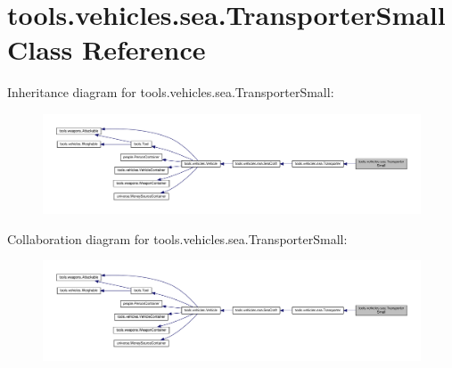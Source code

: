 \hypertarget{classtools_1_1vehicles_1_1sea_1_1_transporter_small}{}\section{tools.\+vehicles.\+sea.\+Transporter\+Small Class Reference}
\label{classtools_1_1vehicles_1_1sea_1_1_transporter_small}


Inheritance diagram for tools.\+vehicles.\+sea.\+Transporter\+Small\+:
\nopagebreak
\begin{figure}[H]
\begin{center}
\leavevmode
\includegraphics[width=350pt]{classtools_1_1vehicles_1_1sea_1_1_transporter_small__inherit__graph}
\end{center}
\end{figure}


Collaboration diagram for tools.\+vehicles.\+sea.\+Transporter\+Small\+:
\nopagebreak
\begin{figure}[H]
\begin{center}
\leavevmode
\includegraphics[width=350pt]{classtools_1_1vehicles_1_1sea_1_1_transporter_small__coll__graph}
\end{center}
\end{figure}
